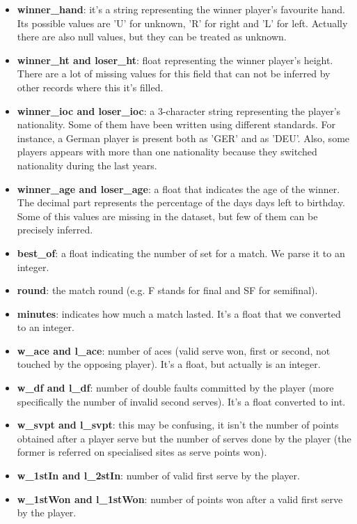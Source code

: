 \begin{itemize}
    \item \textbf{winner\_hand}: it's a string representing the winner player's favourite hand. Its possible values are 'U' for unknown, 'R' for right and 'L' for left. Actually there are also null values, but they can be treated as unknown.
    \item \textbf{winner\_ht and loser\_ht}: float representing the winner player's height. There are a lot of missing values for this field that can not be inferred by other records where this it's filled.
    \item \textbf{winner\_ioc and loser\_ioc}: a 3-character string representing the player's nationality. Some of them have been written using different standards. For instance, a German player is present both as 'GER' and as 'DEU'. Also, some players appears with more than one nationality because they switched nationality during the last years.
    \item \textbf{winner\_age and loser\_age}: a float that indicates the age of the winner. The decimal part represents the percentage of the days days left to birthday. Some of this values are missing in the dataset, but few of them can be precisely inferred.
    \item \textbf{best\_of}: a float indicating the number of set for a match. We parse it to an integer.
    \item \textbf{round}: the match round (e.g. F stands for final and SF for semifinal).
    \item \textbf{minutes}: indicates how much a match lasted. It's a float that we converted to an integer.
    \item \textbf{w\_ace and l\_ace}: number of aces (valid serve won, first or second, not touched by the opposing player). It's a float, but actually is an integer.
    \item \textbf{w\_df and l\_df}: number of double faults committed by the player (more specifically the number of invalid second serves). It's a float converted to int.
    \item \textbf{w\_svpt and l\_svpt}: this may be confusing, it isn't the number of points obtained after a player serve but the number of serves done by the player (the former is referred on specialised sites as serve points won).
    \item \textbf{w\_1stIn and l\_2stIn}: number of valid first serve by the player.
    \item \textbf{w\_1stWon and l\_1stWon}: number of points won after a valid first serve by the player.

\end{itemize}
